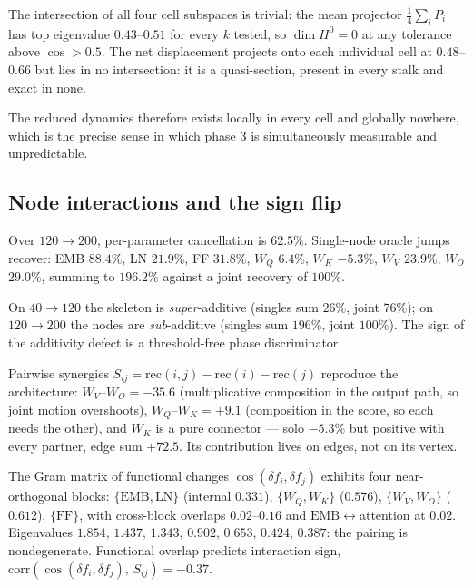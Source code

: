 \begin{proposition}
The intersection of all four cell subspaces is trivial: the mean projector
$\tfrac14\sum_i P_i$ has top eigenvalue $0.43$--$0.51$ for every $k$ tested,
so $\dim H^0 = 0$ at any tolerance above $\cos > 0.5$. The net displacement
projects onto each individual cell at $0.48$--$0.66$ but lies in no
intersection: it is a quasi-section, present in every stalk and exact in none.
\end{proposition}

The reduced dynamics therefore exists locally in every cell and globally
nowhere, which is the precise sense in which phase 3 is simultaneously
measurable and unpredictable.

\subsection{Node interactions and the sign flip}

Over $120\to200$, per-parameter cancellation is $62.5\%$. Single-node oracle
jumps recover: EMB $88.4\%$, LN $21.9\%$, FF $31.8\%$, $W_Q$ $6.4\%$,
$W_K$ $-5.3\%$, $W_V$ $23.9\%$, $W_O$ $29.0\%$, summing to $196.2\%$ against
a joint recovery of $100\%$.

\begin{observation}
On $40\to120$ the skeleton is \emph{super}-additive (singles sum $26\%$,
joint $76\%$); on $120\to200$ the nodes are \emph{sub}-additive (singles sum
$196\%$, joint $100\%$). The sign of the additivity defect is a
threshold-free phase discriminator.
\end{observation}

Pairwise synergies $S_{ij} = \mathrm{rec}(i,j)-\mathrm{rec}(i)-\mathrm{rec}(j)$
reproduce the architecture: $W_V$--$W_O = -35.6$ (multiplicative composition
in the output path, so joint motion overshoots), $W_Q$--$W_K = +9.1$
(composition in the score, so each needs the other), and $W_K$ is a pure
connector --- solo $-5.3\%$ but positive with every partner, edge sum $+72.5$.
Its contribution lives on edges, not on its vertex.

The Gram matrix of functional changes $\cos(\delta f_i, \delta f_j)$ exhibits
four near-orthogonal blocks: $\{\mathrm{EMB},\mathrm{LN}\}$ (internal $0.331$),
$\{W_Q,W_K\}$ ($0.576$), $\{W_V,W_O\}$ ($0.612$), $\{\mathrm{FF}\}$, with
cross-block overlaps $0.02$--$0.16$ and $\mathrm{EMB}\leftrightarrow$attention
at $0.02$. Eigenvalues $1.854,\,1.437,\,1.343,\,0.902,\,0.653,\,0.424,\,0.387$:
the pairing is nondegenerate. Functional overlap predicts interaction sign,
$\mathrm{corr}(\cos(\delta f_i,\delta f_j),\,S_{ij}) = -0.37$.

